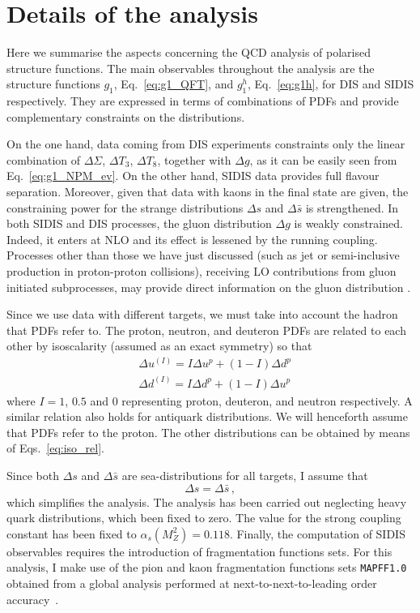 \section{Details of the analysis}
\label{sec:4.2}
Here we summarise the aspects concerning the QCD analysis of polarised structure functions. The main observables throughout the analysis are the structure functions $g_1$, Eq.~\eqref{eq:g1_QFT}, and $g_1^h$, Eq.~\eqref{eq:g1h}, for DIS and SIDIS respectively. They are expressed in terms of combinations of PDFs and provide complementary constraints on the distributions.%

On the one hand, data coming from DIS experiments constraints only the linear combination of $\Delta \Sigma$, $\Delta T_3$, $\Delta T_8$, together with $\Delta g$, as it can be easily seen from Eq.~\eqref{eq:g1_NPM_ev}. On the other hand, SIDIS data provides full flavour separation. Moreover, given that data with kaons in the final state are given, the constraining power for the strange distributions $\Delta s$ and $\Delta \bar{s}$ is strengthened. In both SIDIS and DIS processes, the gluon distribution $\Delta g$ is weakly constrained. Indeed, it enters at NLO and its effect is lessened by the running coupling. Processes other than those we have just discussed (such as jet or semi-inclusive production in proton-proton collisions), receiving LO contributions from gluon initiated subprocesses, may provide direct information on the gluon distribution \cite{Rojo:2015acz}.%

Since we use data with different targets, we must take into account the hadron that PDFs refer to. The proton, neutron, and deuteron PDFs are related to each other by isoscalarity (assumed as an exact symmetry) so that
\begin{equation}
  \begin{split}
    &\Delta u^{(I)} = I \Delta u^p + ( 1 - I ) \Delta d^p \\
    &\Delta d^{(I)} = I \Delta d^p + ( 1 - I ) \Delta u^p
  \end{split}
  \label{eq:iso_rel}
\end{equation}
where $I=1$, $0.5$ and $0$ representing proton, deuteron, and neutron respectively. A similar relation also holds for antiquark distributions. We will henceforth assume that PDFs refer to the proton. The other distributions can be obtained by means of Eqs.~\eqref{eq:iso_rel}.%

Since both $\Delta s$ and $\Delta \bar{s}$ are sea-distributions for all targets, I assume that
\begin{equation}
  \Delta s = \Delta \bar{s} \,,
\end{equation}
which simplifies the analysis. The analysis has been carried out neglecting heavy quark distributions, which been fixed to zero. The value for the strong coupling constant has been fixed to $\alpha_s(M_Z^2) = 0.118$. Finally, the computation of SIDIS observables requires the introduction of fragmentation functions sets. For this analysis, I make use of the pion and kaon fragmentation functions sets \texttt{MAPFF1.0} obtained from a global analysis performed at next-to-next-to-leading order accuracy~\cite{Khalek:2021gxf, AbdulKhalek:2022laj}.

